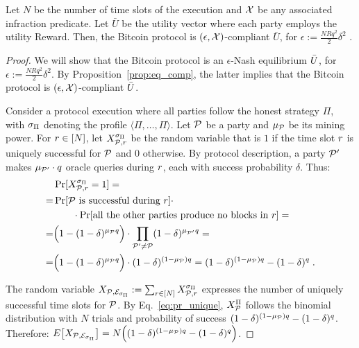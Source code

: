 \begin{theorem}\label{thm:bitcoin_eq_approx}
Let $N$ be the number of time slots of the execution and $\mathcal{X}$
    be any associated infraction predicate. Let $\bar{U}$ be the utility vector
    where each party employs the utility Reward. Then, the Bitcoin protocol is
    $(\epsilon,\mathcal{X})$-compliant \wrt $\bar{U}$, for
    $\epsilon:=\frac{NRq^2}{2}\delta^2$ .
\end{theorem}

\begin{proof}
We will show that the Bitcoin protocol is an $\epsilon$-Nash equilibrium \wrt $\bar{U}$, for $\epsilon:=\frac{NRq^2}{2}\delta^2$. By Proposition~\ref{prop:eq_comp}, the latter implies that the Bitcoin protocol is $(\epsilon,\mathcal{X})$-compliant \wrt $\bar{U}$.

    Consider a protocol execution where all parties follow the honest strategy $\Pi$, with $\sigma_\Pi$ denoting the profile $\langle\Pi,\ldots,\Pi\rangle$. Let $\mathcal{P}$ be a party and $\mu_{\mathcal{P}}$ be its mining power.
For $r\in[N]$, let $X_{\mathcal{P},r}^{\sigma_\Pi}$ be the random variable that is $1$ if the time slot $r$ is uniquely successful for $\mathcal{P}$ and $0$ otherwise. By protocol description, a party $\mathcal{P}'$ makes $\mu_{\mathcal{P}'} \cdot q$ oracle queries during $r$, each with success probability $\delta$. Thus:
\begin{equation}\label{eq:pr_unique}
\begin{split}
&\Pr[X_{\mathcal{P},r}^{\sigma_\Pi}=1]=\\
=&\Pr[\mathcal{P}\mbox{ is successful during }r]\cdot\\
&\quad\quad\cdot\Pr[\mbox{all the other parties produce no blocks in } r]=\\
    =&\Big(1-(1-\delta)^{\mu_{\mathcal{P}} q}\Big)\cdot\prod_{\mathcal{P}'\neq\mathcal{P}}(1-\delta)^{\mu_{\mathcal{P}'} q}=\\
    =&\Big(1-(1-\delta)^{\mu_{\mathcal{P}} q}\Big)\cdot(1-\delta)^{(1-\mu_{\mathcal{P}}) q}
    =(1-\delta)^{(1-\mu_{\mathcal{P}}) q}-(1-\delta)^q\;.
\end{split}
\end{equation}

    The random variable $X_{\mathcal{P},\mathcal{E}_{\sigma_\Pi}}:=\sum_{r\in[N]}X_{\mathcal{P},r}^{\sigma_\Pi}$ expresses the number of uniquely successful time slots for $\mathcal{P}$. By Eq.~\eqref{eq:pr_unique}, $X_{\mathcal{P}}^\Pi$ follows the binomial distribution with $N$ trials and probability of success $(1-\delta)^{(1-\mu_{\mathcal{P}}) q}-(1-\delta)^q$. Therefore:
    $E\big[X_{\mathcal{P},\mathcal{E}_{\sigma_\Pi}}\big]=N\Big((1-\delta)^{(1-\mu_{\mathcal{P}}) q}-(1-\delta)^q\Big)$.


\end{proof}
